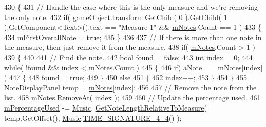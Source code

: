 \begin{DoxyCode}
430         \{
431             \textcolor{comment}{// Handle the case where this is the only measure and we're removing the only note.}
432             \textcolor{keywordflow}{if}( gameObject.transform.GetChild( 0 ).GetChild( 1 ).GetComponent<Text>().text == \textcolor{stringliteral}{"Measure 1"} 
      && \hyperlink{class_song_creation_1_1_measure_display_panel_a096dfc8481f3defcdcb57bfc140ac953}{mNotes}.Count == 1 )
433             \{
434                 \hyperlink{class_song_creation_1_1_measure_display_panel_a3794bf2a605eaa0595e6c6e41f5b458c}{mFirstOverallNote} = \textcolor{keyword}{true};
435             \}
436 
437             \textcolor{comment}{// If there is more than one note in the measure, then just remove it from the measure.}
438             \textcolor{keywordflow}{if}( \hyperlink{class_song_creation_1_1_measure_display_panel_a096dfc8481f3defcdcb57bfc140ac953}{mNotes}.Count > 1 )
439             \{
440 
441                 \textcolor{comment}{// Find the note.}
442                 \textcolor{keywordtype}{bool} found = \textcolor{keyword}{false};
443                 \textcolor{keywordtype}{int} index = 0;
444                 \textcolor{keywordflow}{while}( !found && index < \hyperlink{class_song_creation_1_1_measure_display_panel_a096dfc8481f3defcdcb57bfc140ac953}{mNotes}.Count )
445                 \{
446                     \textcolor{keywordflow}{if}( aNote == \hyperlink{class_song_creation_1_1_measure_display_panel_a096dfc8481f3defcdcb57bfc140ac953}{mNotes}[index] )
447                     \{
448                         found = \textcolor{keyword}{true};
449                     \}
450                     \textcolor{keywordflow}{else}
451                     \{
452                         index++;
453                     \}
454                 \}
455                 NoteDisplayPanel temp = \hyperlink{class_song_creation_1_1_measure_display_panel_a096dfc8481f3defcdcb57bfc140ac953}{mNotes}[index];
456 
457                 \textcolor{comment}{// Remove the note from the list.}
458                 \hyperlink{class_song_creation_1_1_measure_display_panel_a096dfc8481f3defcdcb57bfc140ac953}{mNotes}.RemoveAt( index );
459 
460                 \textcolor{comment}{// Update the percentage used.}
461                 \hyperlink{class_song_creation_1_1_measure_display_panel_a87241a464e8e3ed8ad9011fcebaec50a}{mPercentageUsed} -= \hyperlink{class_music}{Music}.
      \hyperlink{group___music_stat_func_ga91e290b48ad2289493ba4421308abe49}{GetNoteLengthRelativeToMeasure}( temp.GetOffset(), 
      \hyperlink{class_music}{Music}.\hyperlink{group___music_stat_func_gac95af323eef7511543c799154e1c29fd}{TIME\_SIGNATURE\_4\_4}() );

\end{DoxyCode}
